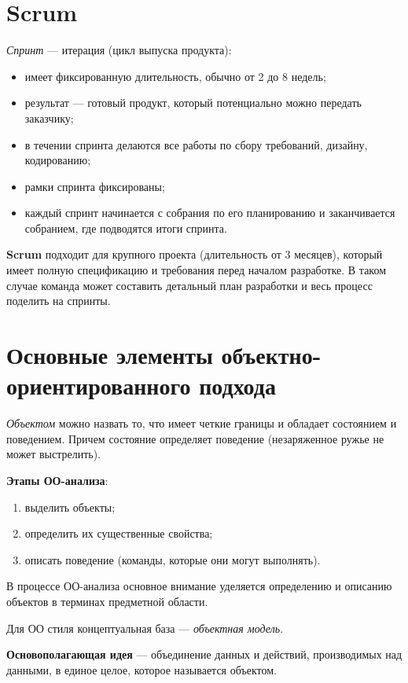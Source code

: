 \documentclass[a4paper,12pt,oneside]{extbook}
\begin{document}
\section{Scrum}%
\label{sec:Scrum}

\textit{Спринт} — итерация (цикл выпуска продукта):
\begin{itemize}
    \item имеет фиксированную длительность, обычно от 2 до 8 недель;
    \item результат — готовый продукт, который потенциально можно передать заказчику;
    \item в течении спринта делаются все работы по сбору требований, дизайну, кодированию;
    \item рамки спринта фиксированы;
    \item каждый спринт начинается с собрания по его планированию и заканчивается собранием, где подводятся итоги спринта.
\end{itemize}

\textbf{Scrum} подходит для крупного проекта (длительность от 3 месяцев), который имеет полную спецификацию и требования перед началом разработке. В таком случае команда может составить детальный план разработки и весь процесс поделить на спринты.

\section{Основные элементы объектно-ориентированного подхода}%
\label{sec:Основные элементы объектно-ориентированного подхода}

\textit{Объектом} можно назвать то, что имеет четкие границы и обладает состоянием и поведением. Причем состояние определяет поведение (незаряженное ружье не может выстрелить).

\textbf{Этапы ОО-анализа}:
\begin{enumerate}
    \item выделить объекты;
    \item определить их существенные свойства;
    \item описать поведение (команды, которые они могут выполнять).
\end{enumerate}

В процессе ОО-анализа основное внимание уделяется определению и описанию объектов в терминах предметной области.

Для ОО стиля концептуальная база — \textit{объектная модель}.

\textbf{Основополагающая идея} — объединение данных и действий, производимых над данными, в единое целое, которое называется объектом.
\end{document}
